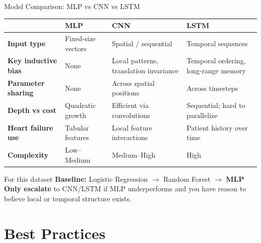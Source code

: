 \documentclass[aspectratio=169]{beamer}
\begin{document}
\begin{frame}{Model Comparison: MLP vs CNN vs LSTM}

\begin{tabular}{@{}lp{2.8cm}p{3cm}p{3.5cm}@{}}
\toprule
 & \textbf{MLP} & \textbf{CNN} & \textbf{LSTM} \\
\midrule
\textbf{Input type} & Fixed-size vectors & Spatial / sequential & Temporal sequences \\
\textbf{Key inductive bias} & None & Local patterns, translation invariance & Temporal ordering, long-range memory \\
\textbf{Parameter sharing} & None & Across spatial positions & Across timesteps \\
\textbf{Depth vs cost} & Quadratic growth & Efficient via convolutions & Sequential; hard to parallelize \\
\textbf{Heart failure use} & Tabular features & Local feature interactions & Patient history over time \\
\textbf{Complexity} & Low--Medium & Medium--High & High \\
\bottomrule
\end{tabular}

\vspace{0.4cm}
\begin{block}{For this dataset}
\textbf{Baseline:} Logistic Regression $\to$ Random Forest $\to$ \textbf{MLP}\\
\textbf{Only escalate} to CNN/LSTM if MLP underperforms and you have reason to believe local or temporal structure exists.
\end{block}
\end{frame}

\section{Best Practices}
\end{document}
